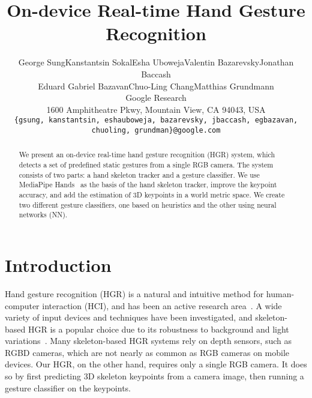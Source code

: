 \documentclass[10pt,twocolumn,letterpaper]{article}
\begin{document}
\title{On-device Real-time Hand Gesture Recognition}

\author{
George Sung\quad Kanstantsin Sokal\quad Esha Uboweja\quad Valentin Bazarevsky\quad Jonathan Baccash\\
Eduard Gabriel Bazavan\quad Chuo-Ling Chang\quad Matthias Grundmann\\
Google Research\\
1600 Amphitheatre Pkwy, Mountain View, CA 94043, USA\\
{\tt\small \{gsung, kanstantsin, eshauboweja, bazarevsky, jbaccash, egbazavan, chuoling, grundman\}@google.com}\\
}


\maketitle
\ificcvfinal\thispagestyle{empty}\fi

\begin{abstract}
   We present an on-device real-time hand gesture recognition (HGR) system, which detects a set of predefined static gestures from a single RGB camera. The system consists of two parts: a hand skeleton tracker and a gesture classifier. We use MediaPipe Hands~\cite{zhang20, mediapipe_hands} as the basis of the hand skeleton tracker, improve the keypoint accuracy, and add the estimation of 3D keypoints in a world metric space. We create two different gesture classifiers, one based on heuristics and the other using neural networks (NN).
\end{abstract}

\section{Introduction}

Hand gesture recognition (HGR) is a natural and intuitive method for human-computer interaction (HCI), and has been an active research area~\cite{rautaray2015vision,oudah2020hand}. A wide variety of input devices and techniques have been investigated, and skeleton-based HGR is a popular choice due to its robustness to background and light variations~\cite{devineau2018deep,de2016skeleton}. Many skeleton-based HGR systems rely on depth sensors, such as RGBD cameras, which are not nearly as common as RGB cameras on mobile devices. Our HGR, on the other hand, requires only a single RGB camera. It does so by first predicting 3D skeleton keypoints from a camera image, then running a gesture classifier on the keypoints.
\end{document}
